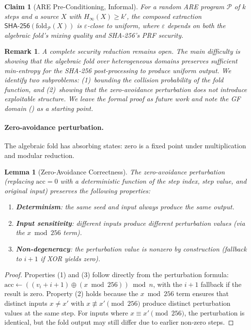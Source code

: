 \documentclass[conference,compsoc]{IEEEtran}
\newtheorem{lemma}[theorem]{Lemma}
\newtheorem{claim}[theorem]{Claim}
\newtheorem*{remark}{Remark}
\newcommand{\are}{\textsc{ARE}\xspace}
\newcommand{\minentropy}{H_{\infty}}
\begin{document}
\begin{claim}[ARE Pre-Conditioning, Informal]
\label{claim:are-extraction}
For a random \are program $\mathcal{P}$ of $k$ steps and a source
$X$ with $\minentropy(X) \geq k'$, the composed extraction
$\mathsf{SHA\text{-}256}(\mathrm{fold}_\mathcal{P}(X))$ is
$\varepsilon$-close to uniform, where $\varepsilon$ depends on both
the algebraic fold's mixing quality and SHA-256's PRF security.
\end{claim}

\begin{remark}
A complete security reduction remains open. The main difficulty
is showing that the algebraic fold over heterogeneous domains
preserves sufficient min-entropy for the SHA-256 post-processing
to produce uniform output. We identify two subproblems:
(1)~bounding the collision probability of the fold function, and
(2)~showing that the zero-avoidance perturbation does not
introduce exploitable structure. We leave the formal proof as
future work and note the GF domain () as
a starting point.
\end{remark}

\paragraph{Zero-avoidance perturbation.}
The algebraic fold has absorbing states: zero is a fixed point
under multiplication and modular reduction.

\begin{lemma}[Zero-Avoidance Correctness]
\label{lem:zero-avoid}
The zero-avoidance perturbation (replacing $\mathrm{acc} = 0$ with
a deterministic function of the step index, step value, and
original input) preserves the following properties:
\begin{enumerate}
  \item \textbf{Determinism}: the same seed and input always
    produce the same output.
  \item \textbf{Input sensitivity}: different inputs produce
    different perturbation values (via the $x \bmod 256$ term).
  \item \textbf{Non-degeneracy}: the perturbation value is nonzero
    by construction (fallback to $i+1$ if XOR yields zero).
\end{enumerate}
\end{lemma}

\begin{proof}
Properties (1) and (3) follow directly from the perturbation
formula: $\mathrm{acc} \gets ((v_i + i + 1) \oplus (x \bmod 256))
\bmod n$, with the $i+1$ fallback if the result is zero.
%
Property (2) holds because the $x \bmod 256$ term ensures that
distinct inputs $x \neq x'$ with $x \not\equiv x' \pmod{256}$
produce distinct perturbation values at the same step.
%
For inputs where $x \equiv x' \pmod{256}$, the perturbation is
identical, but the fold output may still differ due to earlier
non-zero steps.
\end{proof}
\end{document}
